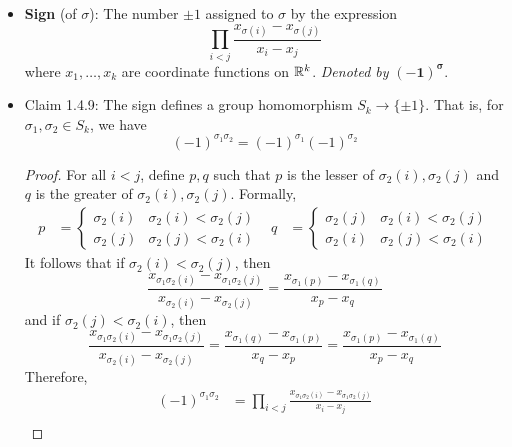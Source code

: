 \documentclass[../notes.tex]{subfiles}
\begin{document}
\begin{itemize}
    \item \textbf{Sign} (of $\sigma$): The number $\pm 1$ assigned to $\sigma$ by the expression
    \begin{equation*}
        \prod_{i<j}\frac{x_{\sigma(i)}-x_{\sigma(j)}}{x_i-x_j}
    \end{equation*}
    where $x_1,\dots,x_k$ are coordinate functions on $\mathbb{R}^k$. \emph{Denoted by} $\bm{(-1)^\sigma}$.
    \item Claim 1.4.9: The sign defines a group homomorphism $S_k\to\{\pm 1\}$. That is, for $\sigma_1,\sigma_2\in S_k$, we have
    \begin{equation*}
        (-1)^{\sigma_1\sigma_2} = (-1)^{\sigma_1}(-1)^{\sigma_2}
    \end{equation*}
    \begin{proof}
        For all $i<j$, define $p,q$ such that $p$ is the lesser of $\sigma_2(i),\sigma_2(j)$ and $q$ is the greater of $\sigma_2(i),\sigma_2(j)$. Formally,
        \begin{align*}
            p &=
            \begin{cases}
                \sigma_2(i) & \sigma_2(i)<\sigma_2(j)\\
                \sigma_2(j) & \sigma_2(j)<\sigma_2(i)
            \end{cases}&
            q &=
            \begin{cases}
                \sigma_2(j) & \sigma_2(i)<\sigma_2(j)\\
                \sigma_2(i) & \sigma_2(j)<\sigma_2(i)
            \end{cases}
        \end{align*}
        It follows that if $\sigma_2(i)<\sigma_2(j)$, then
        \begin{equation*}
            \frac{x_{\sigma_1\sigma_2(i)}-x_{\sigma_1\sigma_2(j)}}{x_{\sigma_2(i)}-x_{\sigma_2(j)}} = \frac{x_{\sigma_1(p)}-x_{\sigma_1(q)}}{x_p-x_q}
        \end{equation*}
        and if $\sigma_2(j)<\sigma_2(i)$, then
        \begin{equation*}
            \frac{x_{\sigma_1\sigma_2(i)}-x_{\sigma_1\sigma_2(j)}}{x_{\sigma_2(i)}-x_{\sigma_2(j)}} = \frac{x_{\sigma_1(q)}-x_{\sigma_1(p)}}{x_q-x_p}
            = \frac{x_{\sigma_1(p)}-x_{\sigma_1(q)}}{x_p-x_q}
        \end{equation*}
        Therefore,
        \begin{align*}
            (-1)^{\sigma_1\sigma_2} &= \prod_{i<j}\frac{x_{\sigma_1\sigma_2(i)}-x_{\sigma_1\sigma_2(j)}}{x_i-x_j}\\

\end{align*}
\end{proof}
\end{itemize}
\end{document}
